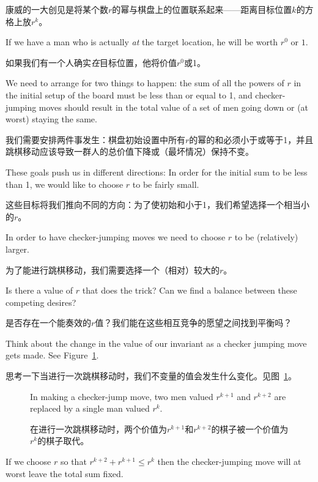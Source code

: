 康威的一大创见是将某个数$r$的幂与棋盘上的位置联系起来——距离目标位置$k$的方格上放$r^k$。

If we have a man who is actually {\em at}
the target location, he will be worth $r^0$ or $1$.

如果我们有一个人确实\emph{在}目标位置，他将价值$r^0$或1。

We need to arrange for
two things to happen:  the sum of all the powers of $r$ in the initial setup
of the board must be less than or equal to 1, and checker-jumping moves should
result in the total value of a set of men going down or (at worst) staying 
the same.

我们需要安排两件事发生：棋盘初始设置中所有$r$的幂的和必须小于或等于1，并且跳棋移动应该导致一群人的总价值下降或（最坏情况）保持不变。

These goals push us in different directions:  In order for the initial sum to be less
than 1, we would like to choose $r$ to be fairly small.

这些目标将我们推向不同的方向：为了使初始和小于1，我们希望选择一个相当小的$r$。

In order to have checker-jumping moves we need to choose $r$ to be (relatively) larger.

为了能进行跳棋移动，我们需要选择一个（相对）较大的$r$。

Is there a value of $r$ that does the trick?  Can we find a balance between these competing 
desires?

是否存在一个能奏效的$r$值？我们能在这些相互竞争的愿望之间找到平衡吗？

Think about the change in the value of our invariant as a checker jumping 
move gets made.  See Figure~\ref{fig:finding_r}.

思考一下当进行一次跳棋移动时，我们不变量的值会发生什么变化。见图~\ref{fig:finding_r}。

\begin{figure}[!hbtp] 
\begin{center}

\end{center}
\caption[Finding $r$.]{In making a checker-jump move, two men valued $r^{k+1}$ and $r^{k+2}$ are replaced by a single man valued $r^k$.}
\caption[寻找r。]{在进行一次跳棋移动时，两个价值为$r^{k+1}$和$r^{k+2}$的棋子被一个价值为$r^k$的棋子取代。}
\label{fig:finding_r}
\end{figure}
 
If we choose $r$ so that $r^{k+2} + r^{k+1} \leq r^k$ then the 
checker-jumping move will at worst leave the total sum fixed.

